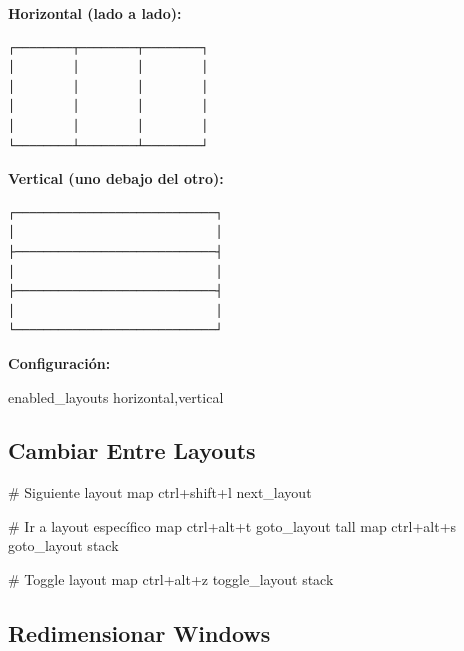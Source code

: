 \documentclass[
  doc,
  floatsintext,
  longtable,
  a4paper,
  nolmodern,
  notxfonts,
  notimes,
  12pt,
  colorlinks=true,linkcolor=blue,citecolor=blue,urlcolor=blue]{apa7}
\newenvironment{Shaded}{\begin{snugshade}}{\end{snugshade}}
\newcommand{\CommentTok}[1]{\textcolor[rgb]{0.37,0.37,0.37}{#1}}
\newcommand{\DataTypeTok}[1]{\textcolor[rgb]{0.68,0.00,0.00}{#1}}
\newcommand{\ErrorTok}[1]{\textcolor[rgb]{0.68,0.00,0.00}{#1}}
\begin{document}
\textbf{Horizontal (lado a lado):}

\begin{verbatim}
┌────────┬────────┬────────┐
│        │        │        │
│        │        │        │
│        │        │        │
│        │        │        │
└────────┴────────┴────────┘
\end{verbatim}

\textbf{Vertical (uno debajo del otro):}

\begin{verbatim}
┌────────────────────────────┐
│                            │
├────────────────────────────┤
│                            │
├────────────────────────────┤
│                            │
└────────────────────────────┘
\end{verbatim}

\textbf{Configuración:}

\begin{Shaded}
\begin{Highlighting}[]
\DataTypeTok{enabled\_layouts} \DataTypeTok{horizontal}\ErrorTok{,}\DataTypeTok{vertical}
\end{Highlighting}
\end{Shaded}

\subsection{Cambiar Entre Layouts}\label{cambiar-entre-layouts}

\begin{Shaded}
\begin{Highlighting}[]
\CommentTok{\# Siguiente layout}
\DataTypeTok{map} \DataTypeTok{ctrl}\ErrorTok{+}\DataTypeTok{shift}\ErrorTok{+}\DataTypeTok{l} \DataTypeTok{next\_layout}

\CommentTok{\# Ir a layout específico}
\DataTypeTok{map} \DataTypeTok{ctrl}\ErrorTok{+}\DataTypeTok{alt}\ErrorTok{+}\DataTypeTok{t} \DataTypeTok{goto\_layout} \DataTypeTok{tall}
\DataTypeTok{map} \DataTypeTok{ctrl}\ErrorTok{+}\DataTypeTok{alt}\ErrorTok{+}\DataTypeTok{s} \DataTypeTok{goto\_layout} \DataTypeTok{stack}

\CommentTok{\# Toggle layout}
\DataTypeTok{map} \DataTypeTok{ctrl}\ErrorTok{+}\DataTypeTok{alt}\ErrorTok{+}\DataTypeTok{z} \DataTypeTok{toggle\_layout} \DataTypeTok{stack}
\end{Highlighting}
\end{Shaded}

\subsection{Redimensionar Windows}\label{redimensionar-windows}
\end{document}
